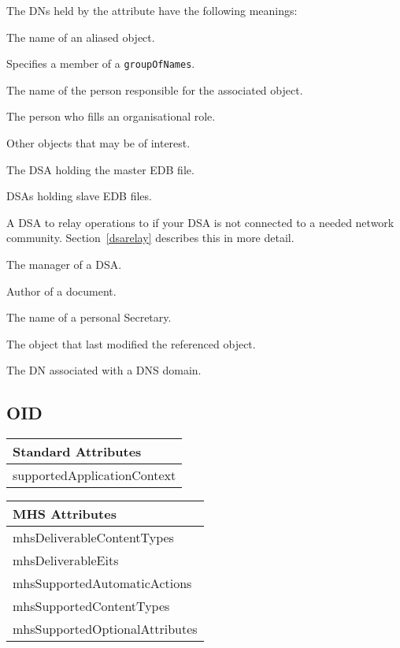 The DNs held by the attribute have the following meanings:
\begin{describe}
\item[\verb+aliasedObjectName+:] The name of an aliased object.
\item[\verb+member+:] Specifies a member of a \verb+groupOfNames+.
\item[\verb+owner+:] The name of the person responsible for the associated object.
\item[\verb+roleOccupant+:] The person who fills an organisational role.
\item[\verb+seeAlso+:] Other objects that may be of interest.
\item[\verb+masterDSA+:] The DSA holding the master EDB file.
\item[\verb+slaveDSA+:] DSAs holding slave EDB files.
\item[\verb+relayDSA+:] A DSA to relay operations to if your DSA is not
connected to a needed network community. Section~\ref{dsarelay}
describes this in more detail.
\item[\verb+manager+:] The manager of a DSA.
\item[\verb+documentAuthor+:] Author of a document.
\item[\verb+secretary+:] The name of a personal Secretary.
\item[\verb+lastModifiedBy+:] The object that last modified the referenced
object.
\item[\verb+associatedName+:] The DN associated with a DNS domain.
\end{describe}

\subsection{OID}

\begin{center}\small
\begin{tabular}{|l|}\hline
Standard Attributes \\ \hline
	supportedApplicationContext\\
\hline
\end{tabular}
\begin{tabular}{|l|}\hline
MHS Attributes \\ \hline
	mhsDeliverableContentTypes\\
	mhsDeliverableEits\\
	mhsSupportedAutomaticActions\\
	mhsSupportedContentTypes\\
	mhsSupportedOptionalAttributes\\
\hline
\end{tabular}
\end{center}

